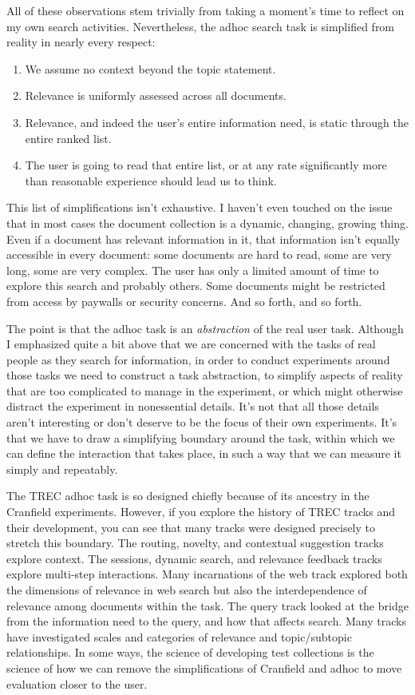 \documentclass[nobib]{tufte-book}
\begin{document}
All of these observations stem trivially from taking a moment's time to reflect on my own search activities.  Nevertheless, the adhoc search task is simplified from reality in nearly every respect:
\begin{enumerate}
    \item We assume no context beyond the topic statement.
    \item Relevance is uniformly assessed across all documents.
    \item Relevance, and indeed the user's entire information need, is static through the entire ranked list.
    \item The user is going to read that entire list, or at any rate significantly more than reasonable experience should lead us to think.
\end{enumerate}
This list of simplifications isn't exhaustive.  I haven't even touched on the issue that in most cases the document collection is a dynamic, changing, growing thing.  Even if a document has relevant information in it, that information isn't equally accessible in every document: some documents are hard to read, some are very long, some are very complex.  The user has only a limited amount of time to explore this search and probably others.  Some documents might be restricted from access by paywalls or security concerns.  And so forth, and so forth.

The point is that the adhoc task is an {\em abstraction} of the real user task.  Although I emphasized quite a bit above that we are concerned with the tasks of real people as they search for information, in order to conduct experiments around those tasks we need to construct a task abstraction, to simplify aspects of reality that are too complicated to manage in the experiment, or which might otherwise distract the experiment in nonessential details.  It's not that all those details aren't interesting or don't deserve to be the focus of their own experiments.  It's that we have to draw a simplifying boundary around the task, within which we can define the interaction that takes place, in such a way that we can measure it simply and repeatably.

The TREC adhoc task is so designed chiefly because of its ancestry in the Cranfield experiments. However, if you explore the history of TREC tracks and their development, you can see that many tracks were designed precisely to stretch this boundary.  The routing, novelty, and contextual suggestion tracks explore context.  The sessions, dynamic search, and relevance feedback tracks explore multi-step interactions.  Many incarnations of the web track explored both the dimensions of relevance in web search but also the interdependence of relevance among documents within the task.  The query track looked at the bridge from the information need to the query, and how that affects search.  Many tracks have investigated scales and categories of relevance and topic/subtopic relationships.  In some ways, the science of developing test collections is the science of how we can remove the simplifications of Cranfield and adhoc to move evaluation closer to the user.
\end{document}
